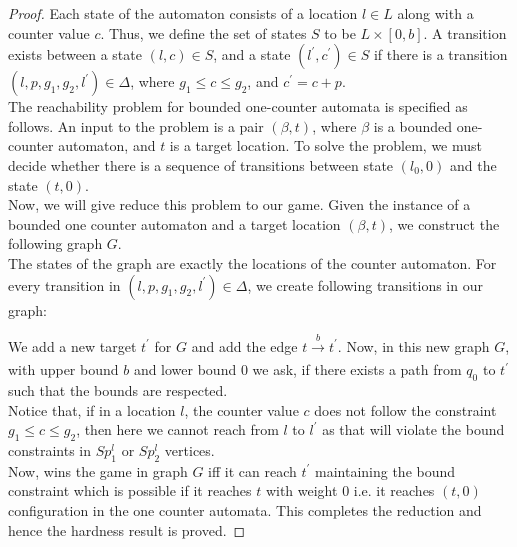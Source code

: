 \begin{proof}
Each state of the automaton consists of a location $l \in L$ along with a counter value $c$. Thus, we define the set of states $S$ to be $L \times [0, b]$. A transition exists between a state $(l, c) \in S$, and a state $(l^{\prime},c^{\prime}) \in S$ if there is a transition $(l, p, g_1, g_2,l^{\prime}) \in \Delta$, where $g_1 \leq c \leq g_2$, and $c^{\prime} = c + p$.\\
\vskip 0.3cm
The reachability problem for bounded one-counter automata is specified as follows. An input to the problem is a pair $(\beta,t)$, where $\beta$ is a bounded one-counter automaton, and $t$ is a target location. To solve the problem, we must decide whether there is a sequence of transitions between state $(l_0, 0)$ and the state $(t, 0)$.\\
\vskip 0.4cm
Now, we will give reduce this problem to our game. Given the instance of a bounded one counter automaton and a target location $(\beta,t)$, we construct the following graph $G$.\\
The states of the graph are exactly the locations of the counter automaton. For every transition in $(l, p, g_1, g_2,l^{\prime}) \in \Delta$, we create following transitions in our graph: \\
\begin{figure}[htb]
\centering
{}
\end{figure}
\vskip 0.5cm
We add a new target $t^{\prime}$ for $G$ and add the edge $t \xrightarrow[]{b} t^{\prime}$. Now, in this new graph $G$, with upper bound $b$ and lower bound $0$ we ask, if there exists a path from $q_0$ to $t^{\prime}$ such that the bounds are respected.\\
Notice that, if in a location $l$, the counter value $c$ does not follow the constraint $g_1 \leq c \leq g_2$, then here we cannot reach from $l$ to $l^{\prime}$ as that will violate the bound constraints in $Sp^{l}_1$ or $Sp^{l}_2$ vertices.\\
Now,  wins the game in graph $G$ iff it can reach $t^{\prime}$ maintaining the bound constraint which is possible if it reaches $t$ with weight $0$ i.e. it reaches $(t,0)$ configuration in the one counter automata. This completes the reduction and hence the hardness result is proved.
\end{proof}

